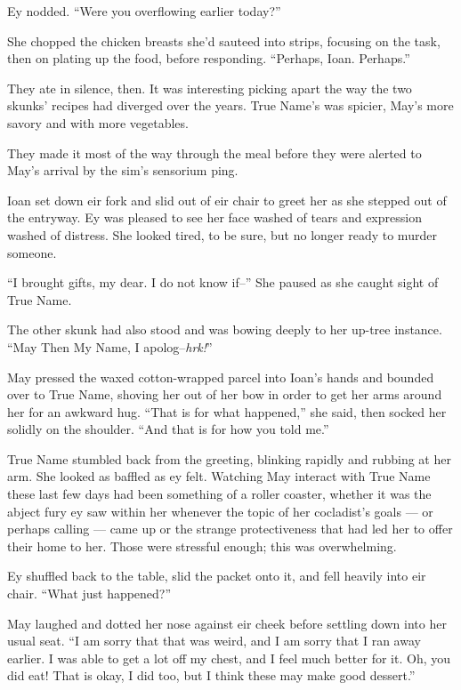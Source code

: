 Ey nodded. ``Were you overflowing earlier today?''

She chopped the chicken breasts she'd sauteed into strips, focusing on the task, then on plating up the food, before responding. ``Perhaps, Ioan. Perhaps.''

They ate in silence, then. It was interesting picking apart the way the two skunks' recipes had diverged over the years. True Name's was spicier, May's more savory and with more vegetables.

They made it most of the way through the meal before they were alerted to May's arrival by the sim's sensorium ping.

Ioan set down eir fork and slid out of eir chair to greet her as she stepped out of the entryway. Ey was pleased to see her face washed of tears and expression washed of distress. She looked tired, to be sure, but no longer ready to murder someone.

``I brought gifts, my dear. I do not know if--'' She paused as she caught sight of True Name.

The other skunk had also stood and was bowing deeply to her up-tree instance. ``May Then My Name, I apolog--\emph{hrk!}''

May pressed the waxed cotton-wrapped parcel into Ioan's hands and bounded over to True Name, shoving her out of her bow in order to get her arms around her for an awkward hug. ``That is for what happened,'' she said, then socked her solidly on the shoulder. ``And that is for how you told me.''

True Name stumbled back from the greeting, blinking rapidly and rubbing at her arm. She looked as baffled as ey felt. Watching May interact with True Name these last few days had been something of a roller coaster, whether it was the abject fury ey saw within her whenever the topic of her cocladist's goals — or perhaps calling — came up or the strange protectiveness that had led her to offer their home to her. Those were stressful enough; this was overwhelming.

Ey shuffled back to the table, slid the packet onto it, and fell heavily into eir chair. ``What just happened?''

May laughed and dotted her nose against eir cheek before settling down into her usual seat. ``I am sorry that that was weird, and I am sorry that I ran away earlier. I was able to get a lot off my chest, and I feel much better for it. Oh, you did eat! That is okay, I did too, but I think these may make good dessert.''

